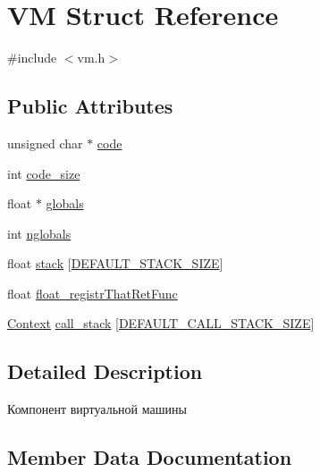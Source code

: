 \hypertarget{struct_v_m}{}\section{VM Struct Reference}
\label{struct_v_m}


{\ttfamily \#include $<$vm.\+h$>$}

\subsection*{Public Attributes}
\begin{DoxyCompactItemize}
\item 
unsigned char $\ast$ \hyperlink{struct_v_m_a760a936633eb5c7b8de120b5d78f9ba6}{code}
\item 
int \hyperlink{struct_v_m_aa5f1f79d48c3a3512a232000f3eb4c26}{code\+\_\+size}
\item 
float $\ast$ \hyperlink{struct_v_m_ab913bee0d5cd7b6b11a1ae4db7f5b576}{globals}
\item 
int \hyperlink{struct_v_m_a68946a4843ec05f3c865d177fa982dbe}{nglobals}
\item 
float \hyperlink{struct_v_m_a1ff291de0c5c28fa61abf17fa9a90fcd}{stack} \mbox{[}\hyperlink{vm_8h_a87dcbc4991a2a2fc4eb6fc6a24449f26}{D\+E\+F\+A\+U\+L\+T\+\_\+\+S\+T\+A\+C\+K\+\_\+\+S\+I\+ZE}\mbox{]}
\item 
float \hyperlink{struct_v_m_af2f5a8140e32988b2e1c20cc4f913b2e}{float\+\_\+registr\+That\+Ret\+Func}
\item 
\hyperlink{struct_context}{Context} \hyperlink{struct_v_m_ac4bacd79fc85e6a75477292f2dfd3707}{call\+\_\+stack} \mbox{[}\hyperlink{vm_8h_a8b344ec0cbf964588d894f826d85fc28}{D\+E\+F\+A\+U\+L\+T\+\_\+\+C\+A\+L\+L\+\_\+\+S\+T\+A\+C\+K\+\_\+\+S\+I\+ZE}\mbox{]}
\end{DoxyCompactItemize}


\subsection{Detailed Description}
Компонент виртуальной машины 

\subsection{Member Data Documentation}
\mbox{\label{struct_v_m_ac4bacd79fc85e6a75477292f2dfd3707}} 
